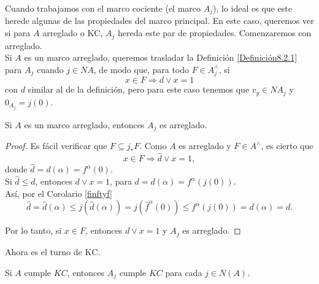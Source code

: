 Cuando trabajamos con el marco cociente (el marco $A_j$), lo ideal es que este herede algunas de las propiedades del marco principal. En este caso, queremos ver si para $A$ arreglado o $\mathrm{KC}$, $A_j$ hereda este par de 
propiedades. Comenzaremos con arreglado.\\

Si $A$ es un marco arreglado, queremos trasladar la Definición \ref{Definición8.2.1} para $A_j$ cuando $j\in NA$, de modo que, para todo $F\in A_j^\wedge$, si
\[
x\in F \Rightarrow d\vee x=1
\]
con $d$ similar al de la definición, pero para este caso tenemos que $v_y\in NA_j$ y $0_{A_j}=j(0)$.

\begin{prop}\label{tidyquout}
    Si $A$ es un marco arreglado, entonces $A_j$ es arreglado.
\end{prop}

\begin{proof}
Es fácil verificar que $F\subseteq j_*F$. Como $A$ es arreglado y $F\in A^\wedge$, es cierto que 
\[
x\in F\Rightarrow \hat{d}\vee x=1,
\]
donde $\hat{d}=d(\alpha)=f^\alpha(0)$.\\
Si $\hat{d}\leq d$, entonces $d\vee x=1$, para $d=d(\alpha)=f^\alpha(j(0))$.\\

Así, por el Corolario \ref{finftyf}
\[
\hat{d}=\hat{d}(\alpha)\leq j(\hat{d}(\alpha))=j(\hat{f}^\alpha(0))\leq f^\alpha(j(0))=d(\alpha)=d.
\]

Por lo tanto, si $x\in F$, entonces $d\vee x=1$ y $A_j$ es arreglado.
\end{proof}

Ahora es el turno de $\mathrm{KC}$.
\begin{prop}\label{KCquout}
    Si $A$ cumple $KC$, entonces $A_j$ cumple $KC$ para cada $j\in N(A).$
\end{prop}

